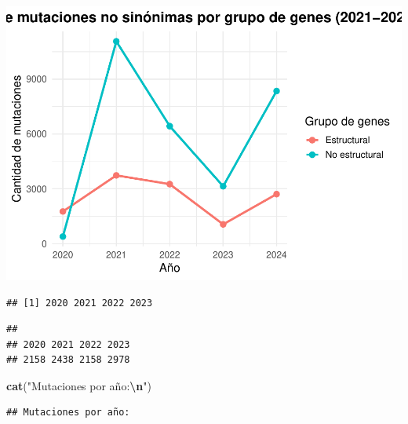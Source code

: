 \documentclass[
]{article}
\newenvironment{Shaded}{\begin{snugshade}}{\end{snugshade}}
\newcommand{\FunctionTok}[1]{\textcolor[rgb]{0.13,0.29,0.53}{\textbf{#1}}}
\newcommand{\NormalTok}[1]{#1}
\newcommand{\SpecialCharTok}[1]{\textcolor[rgb]{0.81,0.36,0.00}{\textbf{#1}}}
\newcommand{\StringTok}[1]{\textcolor[rgb]{0.31,0.60,0.02}{#1}}
\begin{document}
\includegraphics{situacion_problema_files/figure-latex/unnamed-chunk-8-1.pdf}

\begin{Shaded}
\end{Shaded}

\begin{verbatim}
## [1] 2020 2021 2022 2023
\end{verbatim}

\begin{Shaded}
\end{Shaded}

\begin{verbatim}
## 
## 2020 2021 2022 2023 
## 2158 2438 2158 2978
\end{verbatim}

\begin{Shaded}
\begin{Highlighting}[]
\FunctionTok{cat}\NormalTok{(}\StringTok{"Mutaciones por año:}\SpecialCharTok{\textbackslash{}n}\StringTok{"}\NormalTok{)}
\end{Highlighting}
\end{Shaded}

\begin{verbatim}
## Mutaciones por año:
\end{verbatim}
\end{document}
